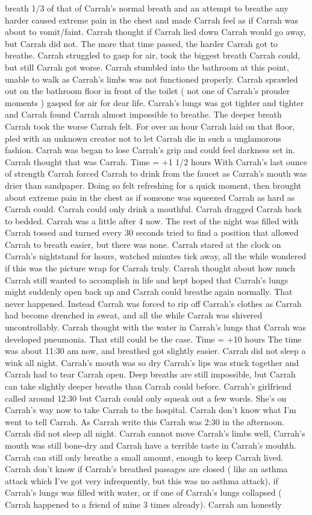 \documentclass[12pt]{book}
\begin{document}
breath 1/3 of that of Carrah's normal breath and an attempt to breathe any harder caused extreme pain in the chest and made Carrah feel as if Carrah was about to vomit/faint. Carrah thought if Carrah lied down Carrah would go away, but Carrah did not. The more that time passed, the harder Carrah got to breathe. Carrah struggled to gasp for air, took the biggest breath Carrah could, but still Carrah got worse. Carrah stumbled into the bathroom at this point, unable to walk as Carrah's limbs was not functioned properly. Carrah sprawled out on the bathroom floor in front of the toilet ( not one of Carrah's prouder moments ) gasped for air for dear life. Carrah's lungs was got tighter and tighter and Carrah found Carrah almost impossible to breathe. The deeper breath Carrah took the worse Carrah felt. For over an hour Carrah laid on that floor, pled with an unknown creator not to let Carrah die in such a unglamorous fashion. Carrah was began to lose Carrah's grip and could feel darkness set in. Carrah thought that was Carrah. Time = +1 1/2 hours With Carrah's last ounce of strength Carrah forced Carrah to drink from the faucet as Carrah's mouth was drier than sandpaper. Doing so felt refreshing for a quick moment, then brought about extreme pain in the chest as if someone was squeezed Carrah as hard as Carrah could. Carrah could only drink a mouthful. Carrah dragged Carrah back to bedded. Carrah was a little after 4 now. The rest of the night was filled with Carrah tossed and turned every 30 seconds tried to find a position that allowed Carrah to breath easier, but there was none. Carrah stared at the clock on Carrah's nightstand for hours, watched minutes tick away, all the while wondered if this was the picture wrap for Carrah truly. Carrah thought about how much Carrah still wanted to accomplish in life and kept hoped that Carrah's lungs might suddenly open back up and Carrah could breathe again normally. That never happened. Instead Carrah was forced to rip off Carrah's clothes as Carrah had become drenched in sweat, and all the while Carrah was shivered uncontrollably. Carrah thought with the water in Carrah's lungs that Carrah was developed pneumonia. That still could be the case. Time = +10 hours The time was about 11:30 am now, and breathed got slightly easier. Carrah did not sleep a wink all night. Carrah's mouth was so dry Carrah's lips was stuck together and Carrah had to tear Carrah open. Deep breaths are still impossible, but Carrah can take slightly deeper breaths than Carrah could before. Carrah's girlfriend called around 12:30 but Carrah could only squeak out a few words. She's on Carrah's way now to take Carrah to the hospital. Carrah don't know what I'm went to tell Carrah. As Carrah write this Carrah was 2:30 in the afternoon. Carrah did not sleep all night. Carrah cannot move Carrah's limbs well, Carrah's mouth was still bone-dry and Carrah have a terrible taste in Carrah's mouhth. Carrah can still only breathe a small amount, enough to keep Carrah lived. Carrah don't know if Carrah's breathed passages are closed ( like an asthma attack which I've got very infrequently, but this was no asthma attack), if Carrah's lungs was filled with water, or if one of Carrah's lungs collapsed ( Carrah happened to a friend of mine 3 times already). Carrah am honestly 
\end{document}
